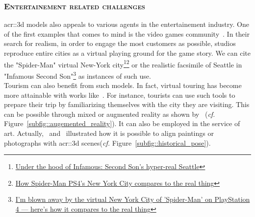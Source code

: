         \subsubsection{\textsc{Entertainement related challenges}}
            \gls{acr::3d} models also appeals to various agents in the entertainement industry.
            One of the first examples that comes to mind is the video games community~\parencite{watson2008procedural}.
            In their search for realism, in order to engage the most customers as possible, studios reproduce entire cities as a virtual playing ground for the game story.
            We can cite the "Spider-Man" virtual New-York city\footnote{
                \href{https://www.polygon.com/2013/9/25/4702318/under-the-hood-of-infamous-second-son-hyper-real-seattle}{Under the hood of Infamous: Second Son's hyper-real Seattle}
            }\footnote{
                \href{https://www.polygon.com/e3/2018/6/12/17453588/spider-man-ps4-new-york-city-avengers-demo-preview}{How Spider-Man PS4’s New York City compares to the real thing}
            } or the realistic facsimile of Seattle in "Infamous Second Son"\footnote{
                \href{http://www.businessinsider.fr/us/spider-man-ps4-new-york-city-2018-9}{I'm blown away by the virtual New York City of 'Spider-Man' on PlayStation 4 — here's how it compares to the real thing}
            } as instances of such use.\\
            Tourism can also benefit from such models.
            In fact, virtual touring has become more attainable with works like~\textcite{koutsoudis20073d}.
            For instance, tourists can use such tools to prepare their trip by familiarizing themselves with the city they are visiting.
            This can be possible through mixed or augmented reality as shown by~\textcite{devaux20183d} (\textit{cf.} Figure~\ref{subfig::augemented_reality}).
            It can also be employed in the service of art.
            Actually,~\textcite{aubry2014painting} and~\textcite{russell2011automatic} illustrated how it is possible to align paintings or photographs with \gls{acr::3d} scenes(\textit{cf.} Figure~\ref{subfig::historical_pose}).\\
